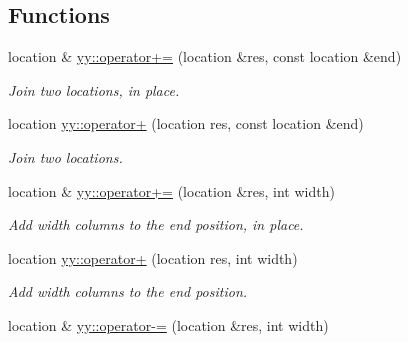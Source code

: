 \subsection*{Functions}
\begin{DoxyCompactItemize}
\item 
location \& \hyperlink{location_8hh_ac14111e26538c547c68b89899951b6b7}{yy\+::operator+=} (location \&res, const location \&end)\hypertarget{location_8hh_ac14111e26538c547c68b89899951b6b7}{}\label{location_8hh_ac14111e26538c547c68b89899951b6b7}

\begin{DoxyCompactList}\small\item\em Join two locations, in place. \end{DoxyCompactList}\item 
location \hyperlink{location_8hh_ad82fe89bde177a8060bad10aca431c79}{yy\+::operator+} (location res, const location \&end)\hypertarget{location_8hh_ad82fe89bde177a8060bad10aca431c79}{}\label{location_8hh_ad82fe89bde177a8060bad10aca431c79}

\begin{DoxyCompactList}\small\item\em Join two locations. \end{DoxyCompactList}\item 
location \& \hyperlink{location_8hh_ab13826f998b111c25c9bf8132c4d63b8}{yy\+::operator+=} (location \&res, int width)\hypertarget{location_8hh_ab13826f998b111c25c9bf8132c4d63b8}{}\label{location_8hh_ab13826f998b111c25c9bf8132c4d63b8}

\begin{DoxyCompactList}\small\item\em Add {\itshape width} columns to the end position, in place. \end{DoxyCompactList}\item 
location \hyperlink{location_8hh_a79201bfa5eaeb04bf279a05ff13281df}{yy\+::operator+} (location res, int width)\hypertarget{location_8hh_a79201bfa5eaeb04bf279a05ff13281df}{}\label{location_8hh_a79201bfa5eaeb04bf279a05ff13281df}

\begin{DoxyCompactList}\small\item\em Add {\itshape width} columns to the end position. \end{DoxyCompactList}\item 
location \& \hyperlink{location_8hh_adf13d2c8b51d1b5c23eb84fce25d202c}{yy\+::operator-\/=} (location \&res, int width)\hypertarget{location_8hh_adf13d2c8b51d1b5c23eb84fce25d202c}{}\label{location_8hh_adf13d2c8b51d1b5c23eb84fce25d202c}


\end{DoxyCompactItemize}
